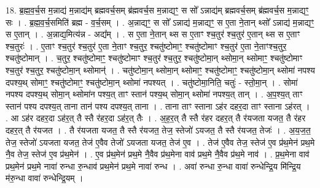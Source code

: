 \documentclass[17pt]{extarticle}
\begin{document}
18. ब्र॒ह्म॒व॒र्च॒स म॒न्नाद्य॑ म॒न्नाद्य॑म् ब्रह्मवर्च॒सम् ब्र॑ह्मवर्च॒स म॒न्नाद्यꣳ॒॒ स सो᳚ ऽन्नाद्य॑म् ब्रह्मवर्च॒सम् ब्र॑ह्मवर्च॒स म॒न्नाद्यꣳ॒॒ सः । . ब्र॒ह्म॒व॒र्च॒समिति॑ ब्रह्म - व॒र्च॒सम् । . अ॒न्नाद्यꣳ॒॒ स सो᳚ ऽन्नाद्य॑ म॒न्नाद्यꣳ॒॒ स ए॒ता ने॒तान् थ्सो᳚ ऽन्नाद्य॑ म॒न्नाद्यꣳ॒॒ स ए॒तान् । . अ॒न्नाद्य॒मित्य॑न्न - अद्य᳚म् । . स ए॒ता ने॒तान् थ्स स ए॒ताꣳ श्च॒तुर॑ श्च॒तुर॑ ए॒तान् थ्स स ए॒ताꣳ श्च॒तुरः॑ । . ए॒ताꣳ श्च॒तुर॑ श्च॒तुर॑ ए॒ता ने॒ताꣳ श्च॒तुर॒ श्चतु॑ष्टोमाꣳ॒॒ श्चतु॑ष्टोमाꣳ श्च॒तुर॑ ए॒ता ने॒ताꣳश्च॒तुर॒ श्चतु॑ष्टोमान् । . च॒तुर॒ श्चतु॑ष्टोमाꣳ॒॒ श्चतु॑ष्टोमाꣳ श्च॒तुर॑ श्च॒तुर॒ श्चतु॑ष्टोमा॒न् थ्सोमा॒न् थ्सोमाꣳ॒॒ श्चतु॑ष्टोमाꣳ श्च॒तुर॑ श्च॒तुर॒ श्चतु॑ष्टोमा॒न् थ्सोमान्॑ । . चतु॑ष्टोमा॒न् थ्सोमा॒न् थ्सोमाꣳ॒॒ श्चतु॑ष्टोमाꣳ॒॒ श्चतु॑ष्टोमा॒न् थ्सोमा॑ नपश्य दपश्य॒थ् 
सोमाꣳ॒॒ श्चतु॑ष्टोमाꣳ॒॒ श्चतु॑ष्टोमा॒न् थ्सोमा॑ नपश्यत् । . चतु॑ष्टोमा॒निति॒ चतुः॑ - स्तो॒मा॒न् । . सोमा॑ नपश्य दपश्य॒थ् सोमा॒न् थ्सोमा॑न पश्य॒त् ताꣳ स्तान॑ पश्य॒थ् सोमा॒न् थ्सोमा॑ नपश्य॒त् तान् । . अ॒प॒श्य॒त् ताꣳ स्तान॑ पश्य दपश्य॒त् ताना तान॑ पश्य दपश्य॒त् ताना । . ताना ताꣳ स्ताना ऽह॑र दहर॒दा ताꣳ स्ताना ऽह॑रत् । . आ ऽह॑र दहर॒दा ऽह॑र॒त् तै स्तै र॑हर॒दा ऽह॑र॒त् तैः । . अ॒ह॒र॒त् तै स्तै र॑हर दहर॒त् तै र॑यजता यजत॒ तै र॑हर दहर॒त् तै र॑यजत । . तै र॑यजता यजत॒ तै स्तै र॑यजत॒ तेज॒ स्तेजो॑ ऽयजत॒ तै स्तै र॑यजत॒ तेजः॑ । . अ॒य॒ज॒त॒ तेज॒ स्तेजो॑ ऽयजता यजत॒ तेज॑ ए॒वैव तेजो॑ ऽयजता यजत॒ तेज॑ ए॒व । . तेज॑ ए॒वैव तेज॒ स्तेज॑ ए॒व प्र॑थ॒मेन॑ प्रथ॒मे नै॒व तेज॒ स्तेज॑ ए॒व प्र॑थ॒मेन॑ । . ए॒व प्र॑थ॒मेन॑ प्रथ॒मे नै॒वैव प्र॑थ॒मेना वाव॑ प्रथ॒मे नै॒वैव प्र॑थ॒मे नाव॑ । . प्र॒थ॒मेना वाव॑ प्रथ॒मेन॑ प्रथ॒मे नावा॑ रुन्धा रु॒न्धाव॑ प्रथ॒मेन॑ प्रथ॒मे नावा॑ रुन्ध । . अवा॑ रुन्धा रु॒न्धा वावा॑ रुन्धेन्द्रि॒य मि॑न्द्रि॒य म॑रु॒न्धा वावा॑ रुन्धेन्द्रि॒यम् । \newline
\end{document}
